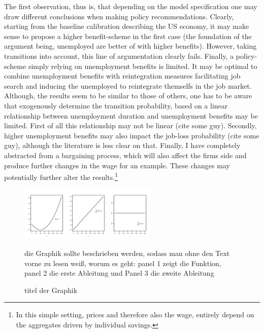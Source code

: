 \documentclass[a4paper,12pt]{article}
\begin{document}
The first observation, thus is, that depending on the model specification one may draw different conclusions when making policy recommendations. Clearly, starting from the baseline calibration describing the US economy, it may make sense to propose a higher benefit-scheme in the first case (the foundation of the argument being, unemployed are better of with higher benefits). However, taking transitions into account, this line of argumentation clearly fails. 
Finally, a policy-scheme simply relying on unemployment benefits is limited. It may be optimal to combine unemployment benefits with reintegration measures facilitating job search and inducing the unemployed to reintegrate themselfs in the job market.
Although, the results seem to be similar to those of others, one has to be aware that exogenously determine the transition probability, based on a linear relationship between unemployment duration and unemployment benefits may be limited. First of all this relationship may not be linear (cite some guy). Secondly, higher unemployment benefits may also impact the job-loss probability (cite some guy), although the literature is less clear on that. Finally, I have completely abstracted from a bargaining process, which will also affect the firms side and produce further changes in the wage\citep{mukoyama} for an example. These changes may potentially further alter the results.\footnote{In this simple setting, prices and therefore also the wage, entirely depend on the aggregates driven by individual savings.}  






\newpage





\newpage

\begin{figure}
\caption{titel der Graphik} 
\label{fig:ersteGraphik}	%
\centering
\includegraphics[width=6.5cm]{abb1.png}  %

\begin{minipage}{0.8\linewidth}
\footnotesize{die Graphik sollte beschrieben werden, sodass man ohne den Text vorne zu lesen wei\ss{}, worum es geht: panel 1 zeigt die Funktion, panel 2 die erste Ableitung und Panel 3 die zweite Ableitung}
\end{minipage}

\end{figure}
\end{document}
